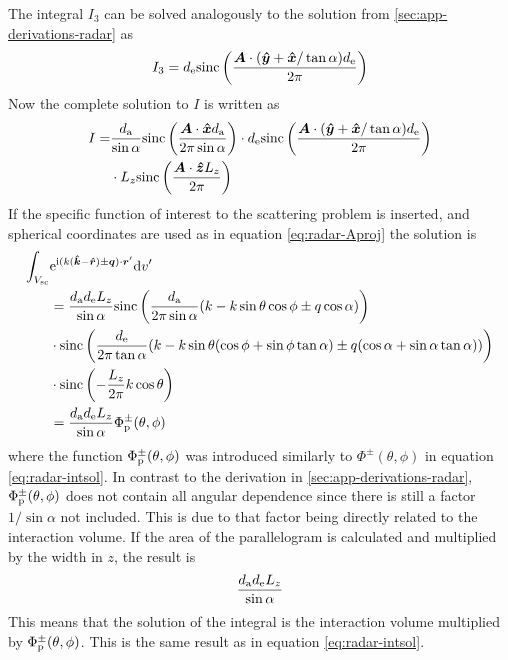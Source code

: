 \documentclass[11pt,twoside]{eitExjobb}
\begin{document}
	The integral $I_3$ can be solved analogously to the solution from \ref{sec:app-derivations-radar} as
	\begin{equation*}
		I_3 = d_{\mathrm{e}} \text{sinc}\left( \frac{\bm{A} \cdot (\bm{\hat{y}} + \bm{\hat{x}}/\tan{\alpha}) d_{\mathrm{e}}}{2\pi} \right)
	\end{equation*}
	Now the complete solution to $I$ is written as
	\begin{equation*}
	\begin{split}
		I =& \frac{d_{\mathrm{a}}}{\sin{\alpha}} \text{sinc}\left( \frac{\bm{A} \cdot \bm{\hat{x}} d_{\mathrm{a}}}{2\pi \sin{\alpha}} \right) \cdot d_{\mathrm{e}} \text{sinc}\left( \frac{\bm{A} \cdot (\bm{\hat{y}} + \bm{\hat{x}}/\tan{\alpha}) d_{\mathrm{e}}}{2\pi} \right) \\
		&\cdot L_{z} \text{sinc}\left( \frac{\bm{A} \cdot \bm{\hat{z}} L_{z}}{2\pi} \right)
	\end{split}
	\end{equation*}
	If the specific function of interest to the scattering problem is inserted, and spherical coordinates are used as in equation \eqref{eq:radar-Aproj} the solution is
	\begin{equation*}
	\begin{split}
		\int_{V_{\mathrm{sc}}} &\mathrm{e}^{\mathrm{i} (	k(\bm{\hat{k}} - \bm{\hat{r}}) \pm \bm{q}) \cdot \bm{r}'} \mathrm{d}v' \\
		&= \frac{d_{\mathrm{a}} d_{\mathrm{e}} L_{z}}{\sin{\alpha}} \text{sinc}\left( \frac{d_{\mathrm{a}}}{2\pi \sin{\alpha}}(k - k\sin{\theta}\cos{\phi} \pm q\cos{\alpha}) \right) \\
		&\cdot \text{sinc}\left( \frac{d_{\mathrm{e}}}{2\pi \tan{\alpha}}
		(k - k\sin{\theta}(\cos{\phi} + \sin{\phi}\tan{\alpha}) \pm q(\cos{\alpha} + \sin{\alpha}\tan{\alpha})) \right) \\
		&\cdot \text{sinc}\left( -\frac{L_{z}}{2\pi} k\cos{\theta} \right) \\
		&= \frac{d_{\mathrm{a}} d_{\mathrm{e}} L_{z}}{\sin{\alpha}} \Phi_{\mathrm{p}}^{\pm}(\theta, \phi)
	\end{split}
	\end{equation*}
	where the function $\Phi_{\mathrm{p}}^{\pm}(\theta, \phi)$ was introduced similarly to $\Phi^{\pm}(\theta, \phi)$ in equation \eqref{eq:radar-intsol}. In contrast to the derivation in \ref{sec:app-derivations-radar}, $\Phi_{\mathrm{p}}^{\pm}(\theta, \phi)$ does not contain all angular dependence since there is still a factor $1/\sin{\alpha}$ not included. This is due to that factor being directly related to the interaction volume. If the area of the parallelogram is calculated and multiplied by the width in $z$, the result is
	\begin{equation*}
		\frac{d_{\mathrm{a}} d_{\mathrm{e}} L_{z}}{\sin{\alpha}}
	\end{equation*}
	This means that the solution of the integral is the interaction volume multiplied by $\Phi_{\mathrm{p}}^{\pm}(\theta, \phi)$. This is the same result as in equation \eqref{eq:radar-intsol}.
	
\end{document}
